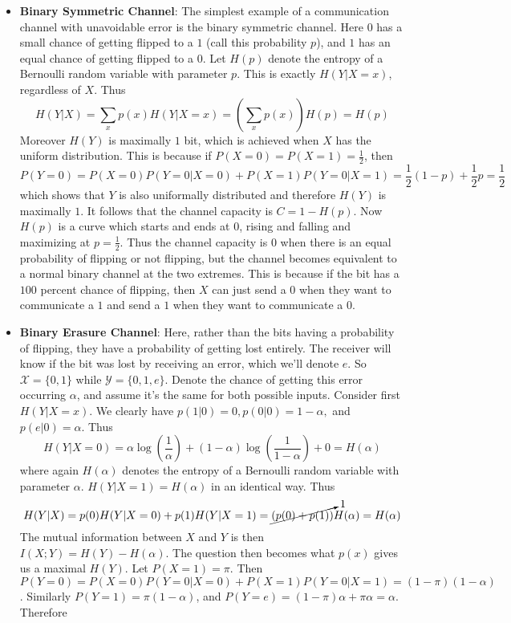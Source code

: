 \begin{itemize}
	\item \textbf{Binary Symmetric Channel}: The simplest example of a communication channel with unavoidable error is the binary symmetric channel. Here $0$ has a small chance of getting flipped to a $1$ (call this probability $p$), and $1$ has an equal chance of getting flipped to a $0$. Let $H(p)$ denote the entropy of a Bernoulli random variable with parameter $p$. This is exactly $H(Y|X = x)$, regardless of $X$. Thus
	\[ H(Y|X) = \sum_x p(x) H(Y|X=x) = \left( \sum_x p(x)\right)H(p) = H(p) \] 
 Moreover $H(Y)$ is maximally $1$ bit, which is achieved when $X$ has the uniform distribution. This is because if $P(X = 0) = P(X = 1) = \frac{1}{2}$, then 
	\[ P(Y=0) = P(X=0)P(Y=0|X=0) + P(X=1)P(Y=0|X=1) = \frac{1}{2}(1-p) + \frac{1}{2}p = \frac{1}{2} \]
	which shows that $Y$ is also uniformally distributed and therefore $H(Y)$ is maximally $1$. It follows that the channel capacity is $C = 1-H(p)$. Now $H(p)$ is a curve which starts and ends at $0$, rising and falling and maximizing at $p=\frac{1}{2}$. Thus the channel capacity is $0$ when there is an equal probability of flipping or not flipping, but the channel becomes equivalent to a normal binary channel at the two extremes. This is because if the bit has a $100$ percent chance of flipping, then $X$ can just send a $0$ when they want to communicate a $1$ and send a $1$ when they want to communicate a $0$. 
	\item \textbf{Binary Erasure Channel}: Here, rather than the bits having a probability of flipping, they have a probability of getting lost entirely. The receiver will know if the bit was lost by receiving an error, which we'll denote $e$. So $\mathcal{X} = \{0,1\}$ while $\mathcal{Y} = \{0,1,e\}$. Denote the chance of getting this error occurring $\alpha$, and assume it's the same for both possible inputs. Consider first $H(Y|X=x)$. We clearly have $p(1|0) = 0, p(0|0)=1-\alpha,$ and $p(e|0) = \alpha$. Thus
	\[ H(Y|X=0) = \alpha\log\left(\frac{1}{\alpha}\right) + (1-\alpha)\log\left(\frac{1}{1-\alpha}\right) + 0 = H(\alpha) \] 
	where again $H(\alpha)$ denotes the entropy of a Bernoulli random variable with parameter $\alpha$. $H(Y|X=1) = H(\alpha)$ in an identical way. Thus
	\[ H(Y|X) = p(0)H(Y|X=0)+p(1)H(Y|X=1) = \cancelto{1}{(p(0)+p(1))}H(\alpha) = H(\alpha) \]
	The mutual information between $X$ and $Y$ is then $I(X;Y) = H(Y) - H(\alpha)$. The question then becomes what $p(x)$ gives us a maximal $H(Y)$. Let $P(X=1) = \pi$. Then $P(Y=0) = P(X=0)P(Y=0|X=0) + P(X=1)P(Y=0|X=1) = (1-\pi)(1-\alpha)$. Similarly $P(Y=1) = \pi(1-\alpha)$, and $P(Y=e) = (1-\pi)\alpha+\pi \alpha = \alpha$. Therefore

\end{itemize}
